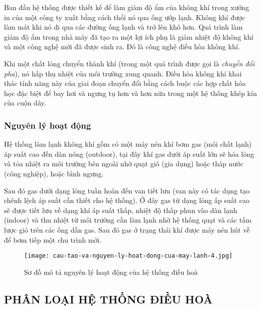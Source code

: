 	Ban đầu hệ thống được thiết kế để làm giảm độ ẩm của không khí trong xưởng in của một công ty xuất bằng cách thổi nó qua ống ướp lạnh. Không khí được làm mát khi nó đi qua các đường ống lạnh và trở lên khô hơn. Quá trình làm giảm độ ẩm trong nhà máy đã tạo ra một lợi ích phụ là giảm nhiệt độ không khí và một công nghệ mới đã được sinh ra. Đó là công nghệ điều hòa không khí.
	
	Khi một chất lỏng chuyển thành khí (trong một quá trình được gọi là \emph{chuyển đổi pha}), nó hấp thụ nhiệt của môi trường xung quanh. Điều hòa không khí khai thác tính năng này của giai đoạn chuyển đổi bằng cách buộc các hợp chất hóa học đặc biệt để bay hơi và ngưng tụ hơn và hơn nữa trong một hệ thống khép kín của cuộn dây.
	
	\subsubsection{Nguyên lý hoạt động}
	Hệ thống làm lạnh không khí gồm có một máy nén khí bơm gas (môi chất lạnh) áp suất cao đến dàn nóng (outdoor), tại đây khí gas dưới áp suất lớn sẽ hóa lỏng và tỏa nhiệt ra môi trường bên ngoài nhờ quạt gió (gia dụng) hoặc tháp nước (công nghiệp), hoặc bình ngưng.

	Sau đó gas dưới dạng lỏng tuần hoàn đến van tiết lưu (van này có tác dụng tạo chênh lệch áp suất cần thiết cho hệ thống). Ở đây gas từ dạng lỏng ấp suất cao sẽ được tiết lưu về dạng khí áp suất thấp, nhiệt độ thấp phun vào dàn lạnh (indoor) và thu nhiệt từ môi trường cần làm lạnh nhờ hệ thống quạt và các tấm lược gió trên các ống dẫn gas. Sau đó gas ở trạng thái khí được máy nén hút về để bơm tiếp một chu trình mới.	
	
	\begin{figure}[H]
		\centering
		\texttt{[image: cau-tao-va-nguyen-ly-hoat-dong-cua-may-lanh-4.jpg]} 
		\caption{Sơ đồ mô tả nguyên lý hoạt động của hệ thống điều hoà}
	\end{figure}
	
	\subsection{PHÂN LOẠI HỆ THỐNG ĐIỀU HOÀ}
